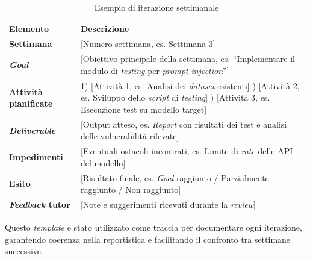\begin{table}[htbp]
\centering
\caption{Esempio di iterazione settimanale}
\label{tab:esempio-iterazione}
\begin{tabularx}{\textwidth}{|l|X|}
\hline
\textbf{Elemento} & \textbf{Descrizione} \\
\hline
\textbf{Settimana} & [Numero settimana, es. Settimana 3] \\
\hline
\textbf{\emph{Goal}} & [Obiettivo principale della settimana, es. ``Implementare il modulo di \emph{testing} per \emph{prompt injection}''] \\
\hline
\textbf{Attività pianificate} & 
1) [Attività 1, es. Analisi dei \emph{dataset} esistenti] \newline
2) [Attività 2, es. Sviluppo dello \emph{script} di \emph{testing}] \newline
3) [Attività 3, es. Esecuzione test su modello target] \\
\hline
\textbf{\emph{Deliverable}} & [Output atteso, es. \emph{Report} con risultati dei test e analisi delle vulnerabilità rilevate] \\
\hline
\textbf{Impedimenti} & [Eventuali ostacoli incontrati, es. Limite di \emph{rate} delle API del modello] \\
\hline
\textbf{Esito} & [Risultato finale, es. \emph{Goal} raggiunto / Parzialmente raggiunto / Non raggiunto] \\
\hline
\textbf{\emph{Feedback} tutor} & [Note e suggerimenti ricevuti durante la \emph{review}] \\
\hline
\end{tabularx}
\end{table}

Questo \emph{template} è stato utilizzato come traccia per documentare ogni iterazione, garantendo coerenza nella reportistica e facilitando il confronto tra settimane successive.
